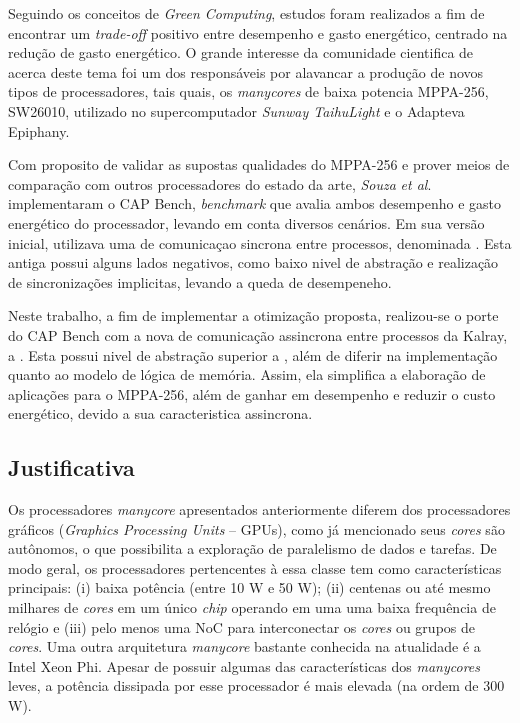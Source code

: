 \documentclass[a4paper,11pt]{article}
\newcommand{\etal}{\textit{et al}.\xspace}
\newcommand{\mppa}{MPPA-256\xspace}
\newcommand{\capb}{CAP Bench\xspace}
\newcommand{\epiphany}{Adapteva Epiphany\xspace}
\begin{document}
Seguindo os conceitos de \textit{Green Computing}, estudos foram realizados a fim de encontrar um \textit{trade-off} positivo entre desempenho e gasto energético, centrado na redução de gasto energético. O grande interesse da comunidade cientifica de \hpc acerca deste tema foi um dos responsáveis por alavancar a produção de novos tipos de processadores, tais quais, os \textit{manycores} de baixa potencia \mppa \cite{MPPA-2:2013}, SW26010, utilizado no supercomputador \textit{Sunway TaihuLight} \cite{sunway:2016} e o \epiphany  \cite{Olofsson2014}.

Com proposito de validar as supostas qualidades do \mppa e prover meios de comparação com outros processadores do estado da arte, \textit{Souza} \etal implementaram o \capb \cite{Castro-Souza-CCPE:2016}, \textit{benchmark} que avalia ambos desempenho e gasto energético do processador, levando em conta diversos cenários. Em sua versão inicial, utilizava uma \api de comunicaçao sincrona entre processos, denominada \ipc \cite{MPPA-2:2013}. Esta antiga \api possui alguns lados negativos, como baixo nivel de abstração e realização de sincronizações implicitas, levando a queda de desempeneho.

Neste trabalho, a fim de implementar a otimização proposta, realizou-se o porte do \capb com a nova \api de comunicação assincrona entre processos da Kalray, a \async \cite{Hascoet2017}. Esta \api possui nivel de abstração superior a \ipc, além de diferir na implementação quanto ao modelo de lógica de memória. Assim, ela simplifica a elaboração de aplicações para o \mppa, além de ganhar em desempenho e reduzir o custo energético, devido a sua caracteristica assincrona.



\subsection{Justificativa}

Os processadores \emph{manycore} apresentados anteriormente diferem dos processadores gráficos (\emph{Graphics Processing Units} -- GPUs), como já mencionado seus \emph{cores} são autônomos, o que possibilita a exploração de paralelismo de dados e tarefas. De modo geral, os processadores pertencentes à essa classe tem como características principais: (i) baixa potência (entre 10 W e 50 W); (ii) centenas ou até mesmo milhares de \emph{cores} em um único \emph{chip} operando em uma uma baixa frequência de relógio e (iii) pelo menos uma NoC para interconectar os \emph{cores} ou grupos de \emph{cores}. Uma outra arquitetura \emph{manycore} bastante conhecida na atualidade é a Intel Xeon Phi. Apesar de possuir algumas das características dos \emph{manycores} leves, a potência dissipada por esse processador é mais elevada (na ordem de 300 W). 
\end{document}
